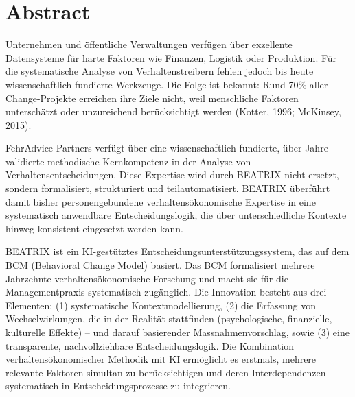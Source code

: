 \documentclass[11pt,a4paper]{article}
\begin{document}

\tableofcontents
\newpage


\section*{Abstract}

Unternehmen und öffentliche Verwaltungen verfügen über exzellente Datensysteme für harte Faktoren wie Finanzen, Logistik oder Produktion. Für die systematische Analyse von Verhaltenstreibern fehlen jedoch bis heute wissenschaftlich fundierte Werkzeuge. Die Folge ist bekannt: Rund 70\% aller Change-Projekte erreichen ihre Ziele nicht, weil menschliche Faktoren unterschätzt oder unzureichend berücksichtigt werden (Kotter, 1996; McKinsey, 2015).

FehrAdvice Partners verfügt über eine wissenschaftlich fundierte, über Jahre validierte methodische Kernkompetenz in der Analyse von Verhaltensentscheidungen. Diese Expertise wird durch BEATRIX nicht ersetzt, sondern formalisiert, strukturiert und teilautomatisiert. BEATRIX überführt damit bisher personengebundene verhaltensökonomische Expertise in eine systematisch anwendbare Entscheidungslogik, die über unterschiedliche Kontexte hinweg konsistent eingesetzt werden kann.

BEATRIX ist ein KI-gestütztes Entscheidungsunterstützungssystem, das auf dem BCM (Behavioral Change Model) basiert. Das BCM formalisiert mehrere Jahrzehnte verhaltensökonomische Forschung und macht sie für die Managementpraxis systematisch zugänglich. Die Innovation besteht aus drei Elementen: (1) systematische Kontextmodellierung, (2) die Erfassung von Wechselwirkungen, die in der Realität stattfinden (psychologische, finanzielle, kulturelle Effekte) -- und darauf basierender Massnahmenvorschlag, sowie (3) eine transparente, nachvollziehbare Entscheidungslogik. Die Kombination verhaltensökonomischer Methodik mit KI ermöglicht es erstmals, mehrere relevante Faktoren simultan zu berücksichtigen und deren Interdependenzen systematisch in Entscheidungsprozesse zu integrieren.
\end{document}
